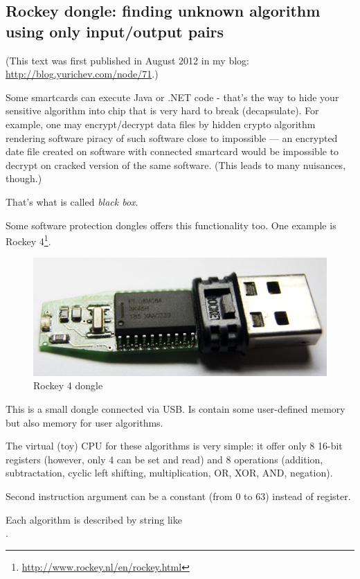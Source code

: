 ﻿\subsection{Rockey dongle: finding unknown algorithm using only input/output pairs}

(This text was first published in August 2012 in my blog: \url{http://blog.yurichev.com/node/71}.)

Some smartcards can execute Java or .NET code - that's the way to hide your sensitive algorithm
into chip that is very hard to break (decapsulate).
For example, one may encrypt/decrypt data files by hidden crypto algorithm rendering software
piracy of such software close to impossible --- an encrypted date file created on software with connected smartcard
would be impossible to decrypt on cracked version of the same software.
(This leads to many nuisances, though.)

That's what is called \textit{black box}.

Some software protection dongles offers this functionality too.
One example is Rockey 4\footnote{\url{http://www.rockey.nl/en/rockey.html}}.

\begin{figure}[H]
\centering
\includegraphics[scale=2]{pgm_synth/rockey/rockey_4.jpg}
\caption{Rockey 4 dongle}
\end{figure}

This is a small dongle connected via USB. Is contain some user-defined memory but also memory for user algorithms.

The virtual (toy) CPU for these algorithms is very simple: it offer only 8 16-bit registers
(however, only 4 can be set and read) and 8 operations
(addition, subtractation, cyclic left shifting, multiplication, OR, XOR, AND, negation).

Second instruction argument can be a constant (from 0 to 63) instead of register.

Each algorithm is described by string like \\
.

